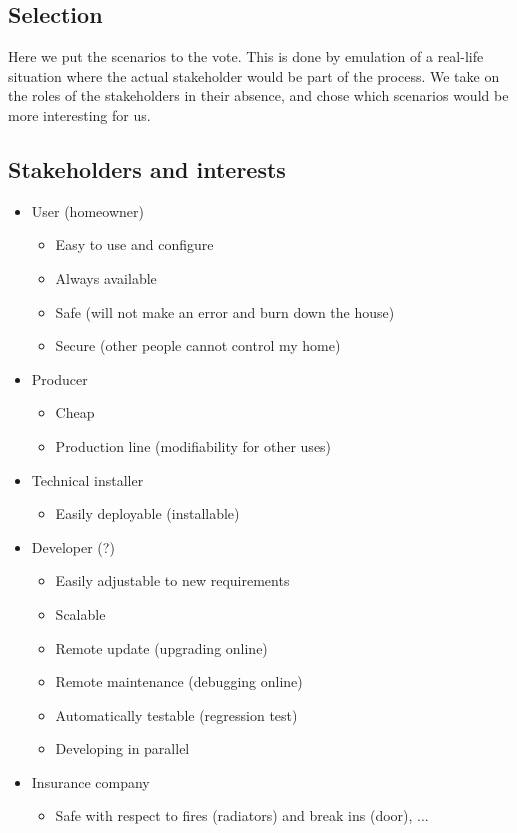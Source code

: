 \documentclass[a4paper,10pt]{article}
\begin{document}
\subsection{Selection}
Here we put the scenarios to the vote. This is done by emulation of a real-life situation where the actual stakeholder would
be part of the process. We take on the roles of the stakeholders in their absence, and chose which scenarios would be more
interesting for us.
\subsection{Stakeholders and interests}
\begin{itemize}
\item User (homeowner)
\begin{itemize}
\item Easy to use and configure
\item Always available
\item Safe (will not make an error and burn down the house)
\item Secure (other people cannot control my home)
\end{itemize}
\item Producer
\begin{itemize}
\item Cheap
\item Production line (modifiability for other uses)
\end{itemize}
\item Technical installer
\begin{itemize}
\item Easily deployable (installable)
\end{itemize}
\item Developer (?)
\begin{itemize}
\item Easily adjustable to new requirements
\item Scalable
\item Remote update (upgrading online)
\item Remote maintenance (debugging online)
\item Automatically testable (regression test)
\item Developing in parallel
\end{itemize}
\item Insurance company
\begin{itemize}
\item Safe with respect to fires (radiators) and break ins (door), ...
\end{itemize}
\end{itemize}
\end{document}
